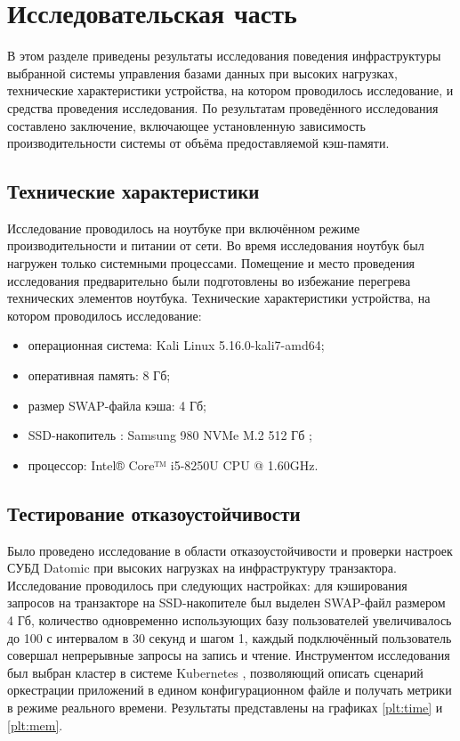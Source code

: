 \section{Исследовательская часть}

В этом разделе приведены результаты исследования поведения инфраструктуры выбранной системы управления базами данных при высоких нагрузках, технические характеристики устройства, на котором проводилось исследование, и средства проведения исследования. По результатам проведённого исследования составлено заключение, включающее установленную зависимость производительности системы от объёма предоставляемой кэш-памяти.

\subsection{Технические характеристики}

Исследование проводилось на ноутбуке при включённом режиме производительности и питании от сети. Во время исследования ноутбук был нагружен только системными процессами. Помещение и место проведения исследования предварительно были подготовлены во избежание перегрева технических элементов ноутбука. Технические характеристики устройства, на котором проводилось исследование:

\begin{itemize}
	\item операционная система: Kali \cite{kali} Linux \cite{linux} 5.16.0-kali7-amd64;
	\item оперативная память: 8 Гб;
	\item размер SWAP-файла \cite{swap} кэша: 4 Гб;
	\item SSD-накопитель \cite{ssd}: Samsung 980 NVMe M.2 512 Гб \cite{evo};
	\item процессор: Intel® Core™ i5-8250U \cite{intel} CPU @ 1.60GHz.
\end{itemize}

\subsection{Тестирование отказоустойчивости}

Было проведено исследование в области отказоустойчивости и проверки настроек СУБД Datomic при высоких нагрузках на инфраструктуру транзактора. Исследование проводилось при следующих настройках: для кэширования запросов на транзакторе на SSD-накопителе был выделен SWAP-файл размером 4 Гб, количество одновременно использующих базу пользователей увеличивалось до 100 с интервалом в 30 секунд и шагом 1, каждый подключённый пользователь совершал непрерывные запросы на запись и чтение. Инструментом исследования был выбран кластер в системе Kubernetes \cite{kuber}, позволяющий описать сценарий оркестрации приложений в едином конфигурационном файле и получать метрики в режиме реального времени. Результаты представлены на графиках \ref{plt:time} и \ref{plt:mem}.

